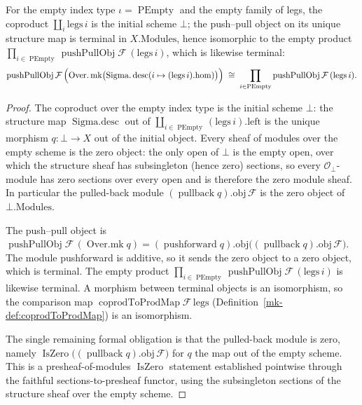 \begin{lemma}
  \label{mk-lem:pushPull_coprod_prod_empty}

  For the empty index type \(\iota = \operatorname{PEmpty}\) and the empty family of legs, the coproduct
  \(\coprod_{i} \mathrm{legs}\,i\) is the initial scheme \(\bot\); the push--pull object on its unique
  structure map is terminal in \(X.\mathrm{Modules}\), hence isomorphic to the empty product
  \(\prod_{i \in \operatorname{PEmpty}} \operatorname{pushPullObj}\mathcal{F}\,(\mathrm{legs}\,i)\),
  which is likewise terminal:
  \[
    \operatorname{pushPullObj}\mathcal{F}\,\Bigl(\operatorname{Over.mk}\bigl(
      \operatorname{Sigma.desc}(i \mapsto (\mathrm{legs}\,i).\mathrm{hom})\bigr)\Bigr)
      \;\cong\;
    \prod_{i \in \operatorname{PEmpty}} \operatorname{pushPullObj}\mathcal{F}\,(\mathrm{legs}\,i).
  \]
\end{lemma}
\begin{proof}
  The coproduct over the empty index type is the initial scheme \(\bot\): the structure map
  \(\operatorname{Sigma.desc}\) out of \(\coprod_{i \in \operatorname{PEmpty}} (\mathrm{legs}\,i).
  \mathrm{left}\) is the unique morphism \(q : \bot \to X\) out of the initial object. Every sheaf of
  modules over the empty scheme is the zero object: the only open of \(\bot\) is the empty open, over
  which the structure sheaf has subsingleton (hence zero) sections, so every
  \(\mathcal{O}_\bot\)-module has zero sections over every open and is therefore the zero module sheaf.
  In particular the pulled-back module \((\operatorname{pullback} q).\mathrm{obj}\,\mathcal{F}\) is the
  zero object of \(\bot.\mathrm{Modules}\).

  The push--pull object is \(\operatorname{pushPullObj}\mathcal{F}\,(\operatorname{Over.mk} q) =
  (\operatorname{pushforward} q).\mathrm{obj}\bigl((\operatorname{pullback} q).\mathrm{obj}\,
  \mathcal{F}\bigr)\). The module pushforward is additive, so it sends the zero object to a zero
  object, which is terminal. The empty product \(\prod_{i \in \operatorname{PEmpty}}
  \operatorname{pushPullObj}\mathcal{F}\,(\mathrm{legs}\,i)\) is likewise terminal. A morphism between
  terminal objects is an isomorphism, so the comparison map
  \(\operatorname{coprodToProdMap}\mathcal{F}\,\mathrm{legs}\) (Definition~\ref{mk-def:coprodToProdMap}) is
  an isomorphism.

  The single remaining formal obligation is that the pulled-back module is zero, namely
  \(\operatorname{IsZero}\bigl((\operatorname{pullback} q).\mathrm{obj}\,\mathcal{F}\bigr)\) for \(q\)
  the map out of the empty scheme. This is a presheaf-of-modules \(\operatorname{IsZero}\) statement
  established pointwise through the faithful sections-to-presheaf functor, using the subsingleton
  sections of the structure sheaf over the empty scheme.
\end{proof}

